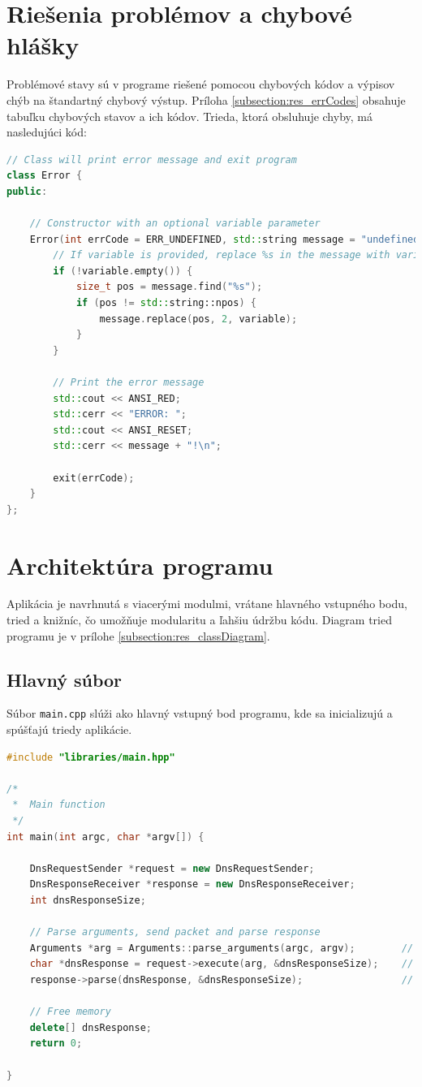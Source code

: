 \documentclass[a4paper, 11pt]{article}
\begin{document}
	\section{Riešenia problémov a chybové hlášky}
	Problémové stavy sú v programe riešené pomocou chybových kódov a výpisov chýb na štandartný chybový výstup.
	Príloha \ref{subsection:res_errCodes} obsahuje tabuľku chybových stavov a ich kódov.
	Trieda, ktorá obsluhuje chyby, má nasledujúci kód:
	\begin{lstlisting}[language=C++, caption={Kód triedy Error}]
// Class will print error message and exit program 
class Error {
public:
		
	// Constructor with an optional variable parameter
	Error(int errCode = ERR_UNDEFINED, std::string message = "undefined", std::string variable = "") {
		// If variable is provided, replace %s in the message with variable
		if (!variable.empty()) {
			size_t pos = message.find("%s");
			if (pos != std::string::npos) {
				message.replace(pos, 2, variable);
			}
		}
	
		// Print the error message
		std::cout << ANSI_RED;
		std::cerr << "ERROR: ";
		std::cout << ANSI_RESET;
		std::cerr << message + "!\n";
			
		exit(errCode);
	}
};
	\end{lstlisting}
		
	
	\section{Architektúra programu}
	Aplikácia je navrhnutá s viacerými modulmi, vrátane hlavného vstupného bodu, tried a knižníc, čo umožňuje modularitu a ľahšiu údržbu kódu. Diagram tried programu je v prílohe \ref{subsection:res_classDiagram}.

	\subsection{Hlavný súbor}
	Súbor \texttt{main.cpp} slúži ako hlavný vstupný bod programu, kde sa inicializujú a spúšťajú triedy aplikácie.
	\begin{lstlisting}[language=C++, caption={Kód hlavného súboru}]
#include "libraries/main.hpp"

/*
 *  Main function
 */
int main(int argc, char *argv[]) {

	DnsRequestSender *request = new DnsRequestSender;
	DnsResponseReceiver *response = new DnsResponseReceiver;
	int dnsResponseSize;

	// Parse arguments, send packet and parse response
	Arguments *arg = Arguments::parse_arguments(argc, argv);    	// Parse command-line arguments into an 'Arguments' object
	char *dnsResponse = request->execute(arg, &dnsResponseSize);    // Send DNS request
	response->parse(dnsResponse, &dnsResponseSize);                 // Parse DNS answer

	// Free memory
	delete[] dnsResponse;
	return 0;
	
}

	\end{lstlisting}
	
\end{document}
